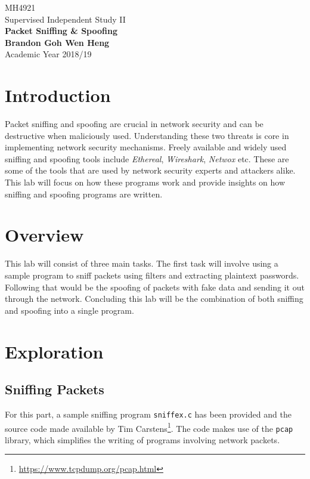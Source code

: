 \documentclass[a4paper,12pt]{article}
\begin{document}
	\begin{titlepage}
		\begin{center}
			\vspace*{9em}
			\Huge 
			MH4921\\ Supervised Independent Study II\\
			\vspace*{4em}
			\LARGE
			\textbf{Packet Sniffing \& Spoofing}\\		
			\vspace{4em}
			\textbf{Brandon Goh Wen Heng}\\
			\vspace*{4em}
			Academic Year 2018/19
			\vfill
		\end{center}
	\end{titlepage}
	
	\tableofcontents
	\newpage
	\section{Introduction}
Packet sniffing and spoofing are crucial in network security and can be destructive when maliciously used. Understanding these two threats is core in implementing network security mechanisms. Freely available and widely used sniffing and spoofing tools include \textit{Ethereal}, \textit{Wireshark}, \textit{Netwox} etc. These are some of the tools that are used by network security experts and attackers alike. This lab will focus on how these programs work and provide insights on how sniffing and spoofing programs are written.
\section{Overview}
This lab will consist of three main tasks. The first task will involve using a sample program to sniff packets using filters and extracting plaintext passwords. Following that would be the spoofing of packets with fake data and sending it out through the network. Concluding this lab will be the combination of both sniffing and spoofing into a single program.
\section{Exploration}
\subsection{Sniffing Packets}
For this part, a sample sniffing program \texttt{sniffex.c} has been provided and the source code made available by Tim Carstens\footnote{\url{https://www.tcpdump.org/pcap.html}}. The code makes use of the \texttt{pcap} library, which simplifies the writing of programs involving network packets.
\end{document}
